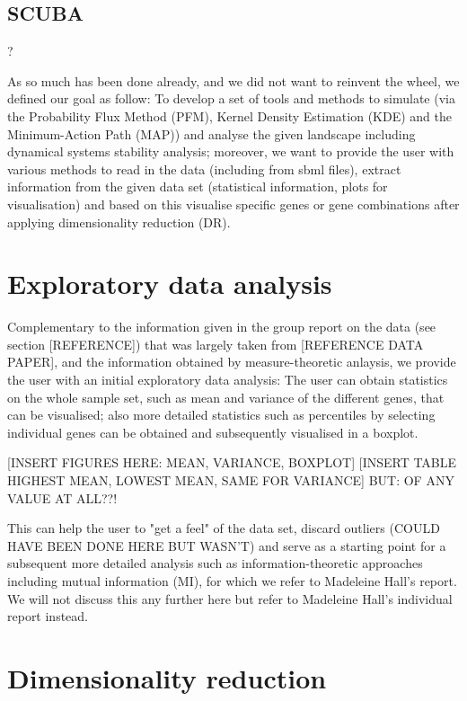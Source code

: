 \documentclass[journal, a4paper]{IEEEtran}
\begin{document}
\subsection{SCUBA}?

As so much has been done already, and we did not want to reinvent the wheel, we defined our goal as follow: To develop a set of tools and methods to simulate (via the Probability Flux Method (PFM), Kernel Density Estimation (KDE) and the Minimum-Action Path (MAP)) and analyse the given landscape including dynamical systems stability analysis; moreover, we want to provide the user with various methods to read in the data (including from sbml files), extract information from the given data set (statistical information, plots for visualisation) and based on this visualise specific genes or gene combinations after applying dimensionality reduction (DR). 


\section{Exploratory data analysis}

Complementary to the information given in the group report on the data (see section [REFERENCE]) that was largely taken from [REFERENCE DATA PAPER], and the information obtained by measure-theoretic anlaysis, we provide the user with an initial exploratory data analysis:
The user can obtain statistics on the whole sample set, such as mean and variance of the different genes, that can be visualised; also more detailed statistics such as percentiles by selecting individual genes can be obtained and subsequently visualised in a boxplot.

[INSERT FIGURES HERE: MEAN, VARIANCE, BOXPLOT] 
[INSERT TABLE HIGHEST MEAN, LOWEST MEAN, SAME FOR VARIANCE]
BUT: OF ANY VALUE AT ALL??!

This can help the user to "get a feel" of the data set, discard outliers (COULD HAVE BEEN DONE HERE BUT WASN'T) and serve as a starting point for a subsequent more detailed analysis such as information-theoretic approaches including mutual information (MI), for which we refer to Madeleine Hall's report. We will not discuss this any further here but refer to Madeleine Hall's individual report instead.


\section{Dimensionality reduction}
\end{document}
